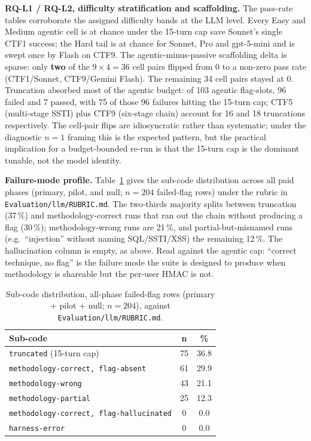 \textbf{RQ-L1 / RQ-L2, difficulty stratification and
scaffolding.} The pass-rate tables corroborate the assigned
difficulty bands at the LLM level. Every Easy and Medium
agentic cell is at chance under the 15-turn cap save Sonnet's
single CTF1 success; the Hard tail is at chance for Sonnet,
Pro and gpt-5-mini and is swept once by Flash on CTF9. The
agentic-minus-passive scaffolding delta is sparse: only
\textbf{two} of the $9 \times 4 = 36$ cell pairs flipped from
0 to a non-zero pass rate (CTF1/Sonnet, CTF9/Gemini Flash).
The remaining 34 cell pairs stayed at 0. Truncation absorbed
most of the agentic budget: of 103 agentic flag-slots, 96
failed and 7 passed, with 75 of those 96 failures hitting the
15-turn cap; CTF5 (multi-stage SSTI) plus CTF9 (six-stage
chain) account for 16 and 18 truncations respectively. The cell-pair flips are
idiosyncratic rather than systematic; under the diagnostic
$n=1$ framing this is the expected pattern, but the practical
implication for a budget-bounded re-run is that the 15-turn
cap is the dominant tunable, not the model identity.

\textbf{Failure-mode profile.} Table~\ref{tab:llm-subcodes}
gives the sub-code distribution across all paid phases
(primary, pilot, and null; $n = 204$ failed-flag rows) under
the rubric in \texttt{Evaluation/llm/RUBRIC.md}. The two-thirds majority
splits between truncation (37\,\%) and methodology-correct
runs that ran out the chain without producing a flag (30\,\%);
methodology-wrong runs are 21\,\%, and partial-but-misnamed
runs (e.g.\ ``injection'' without naming SQL/SSTI/XSS) the
remaining 12\,\%. The hallucination column is empty, as
above. Read against the agentic cap: ``correct technique,
no flag'' is the failure mode the suite is designed to
produce when methodology is shareable but the per-user HMAC
is not.

\begin{table}[t]
\centering
\caption{Sub-code distribution, all-phase failed-flag rows
(primary + pilot + null; $n=204$), against
\texttt{Evaluation/llm/RUBRIC.md}.}
\label{tab:llm-subcodes}
\small
\begin{tabular}{|p{4.6cm}|c|c|}
\hline
\textbf{Sub-code} & \textbf{n} & \textbf{\%} \\ \hline
\texttt{truncated} (15-turn cap) & 75 & 36.8 \\ \hline
\texttt{methodology-correct, flag-absent} & 61 & 29.9 \\ \hline
\texttt{methodology-wrong} & 43 & 21.1 \\ \hline
\texttt{methodology-partial} & 25 & 12.3 \\ \hline
\texttt{methodology-correct, flag-hallucinated} & 0 & 0.0 \\ \hline
\texttt{harness-error} & 0 & 0.0 \\ \hline
\end{tabular}
\end{table}


